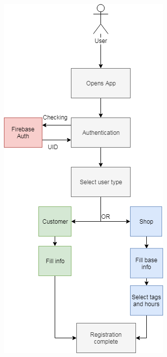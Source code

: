 \begin{figure}[H]
  \centering
  \begin{minipage}[b]{0.45\textwidth}
    \includegraphics[width=\textwidth]{Img/RegistrationDiagram}

\end{minipage}
\end{figure}
